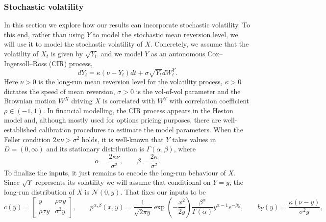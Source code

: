 \documentclass{article}
\theoremstyle{plain}
\theoremstyle{definition}
\newcommand{\Ncal}{{\mathcal N}}
\numberwithin{lem}{section}
\begin{document}


\subsubsection{Stochastic volatility} \label{sec:stoch_vol}
In this section we explore how our results can incorporate stochastic volatility. To this end, rather than using $Y$ to model the stochastic mean reversion level, we will use it to model the stochastic volatility of $X$. Concretely, we assume that the volatility of $X_t$ is given by $\sqrt{Y_t}$ and we model $Y$ as an autonomous Cox--Ingersoll--Ross (CIR) process,
\[dY_t = \kappa(\nu - Y_t)dt + \sigma\sqrt{Y_t} dW^Y_t.\]
Here $\nu > 0$ is the long-run mean reversion level for the volatility process, $\kappa > 0$ dictates the speed of mean reversion, $\sigma > 0$ is the vol-of-vol parameter and the Brownian motion $W^X$ driving $X$ is correlated with $W^Y$  with correlation coefficient $\rho \in (-1,1)$. In financial modelling, the CIR process appears in the Heston model \cite{heston1993closed} and, although mostly used for options pricing purposes, there are well-established calibration procedures to estimate the model parameters. When the Feller condition $2\kappa \nu > \sigma^2$ holds, it is well-known that $Y$ takes values in $D = (0,\infty)$ and its stationary distribution is $\Gamma(\alpha,\beta)$, where
\[\alpha = \frac{2\kappa\nu}{\sigma^2}, \qquad \beta = \frac{2\kappa}{\sigma^2}.\]
To finalize the inputs, it just remains to encode the long-run behaviour of $X$. Since $\sqrt{Y}$ represents its volatility we will assume that conditional on $Y=y$, the long-run distribution of $X$ is $\Ncal(0,y)$. That fixes our inputs to be
\[c(y) = \begin{bmatrix}
    y & \rho \sigma y \\ \rho \sigma y & \sigma^2 y
\end{bmatrix}, \qquad p^{\alpha,\beta}(x,y) =             \frac{1}{\sqrt{2 \pi y}} \exp \left( -\frac{x^2}{2y} \right)
     \frac{\beta^\alpha}{\Gamma(\alpha)}y^{\alpha-1}e^{-\beta y}, \qquad b_Y(y) = \frac{\kappa(\nu - y)}{\sigma^2 y},\]
\end{document}
